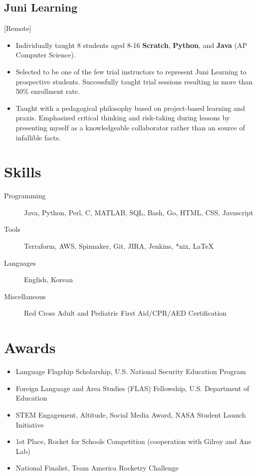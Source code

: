 \documentclass{mycv}
\begin{document}
\subsection{Juni Learning}[Remote]
\begin{positions}
\end{positions}
\begin{itemize}
  \item {
  Individually taught 8 students aged 8-16 \textbf{Scratch}, \textbf{Python}, and \textbf{Java} (AP Computer Science). 
  }
  \item{
    Selected to be one of the few trial instructors to represent Juni Learning to prospective students.
  Successfully taught trial sessions resulting in more than 50\% enrollment rate.
  }
  \item{
    Taught with a pedagogical philosophy based on project-based learning and praxis.
    Emphasized critical thinking and risk-taking during lessons by presenting myself as a
    knowledgeable collaborator rather than an source of infallible facts. 
  }
\end{itemize}


\section{Skills}
\begin{description}
  \item[Programming] Java, Python, Perl, C, MATLAB, SQL, Bash, Go, HTML, CSS, Javascript
  \item[Tools] Terraform, AWS, Spinnaker, Git, JIRA, Jenkins, *nix, \LaTeX 
  \item[Languages] English, Korean
  \item[Miscellaneous] Red Cross Adult and Pediatric First Aid/CPR/AED Certification
\end{description}
\section{Awards}
\begin{itemize}
    \item{Language Flagship Scholarship, U.S. National Security
    Education Program }
    \item{Foreign Language and Area Studies (FLAS) Fellowship, U.S. Department of Education }
    \item {STEM Engagement, Altitude, Social Media Award, NASA Student Launch Initiative }
    \item {1st Place, Rocket for Schools Competition (cooperation with Gilroy and Ane Lab) }
    \item National Finalist, Team America Rocketry Challenge 
\end{itemize}
\thispagestyle{empty} 
\end{document}
